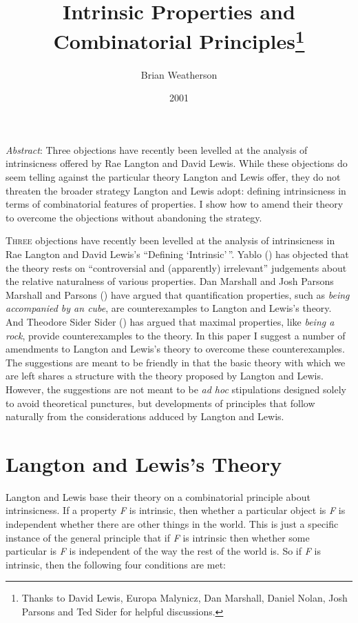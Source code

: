 \documentclass[
  11pt,
  letterpaper,
  DIV=11,
  numbers=noendperiod,
  twoside]{scrartcl}
\title{Intrinsic Properties and Combinatorial Principles\thanks{Thanks
to David Lewis, Europa Malynicz, Dan Marshall, Daniel Nolan, Josh
Parsons and Ted Sider for helpful discussions.}}
\author{Brian Weatherson}
\date{2001}
\renewenvironment{abstract}
 {\vspace{-1.25cm}
 \quotation\small\noindent\emph{Abstract}:}
 {\endquotation}
\renewenvironment{abstract}
 {\quotation\small\noindent\emph{Abstract}:}
 {\endquotation\vspace{-0.02cm}}
\renewcommand{\textsc}[1]{{\scfont #1}}
\begin{document}
\maketitle
\begin{abstract}
Three objections have recently been levelled at the analysis of
intrinsicness offered by Rae Langton and David Lewis. While these
objections do seem telling against the particular theory Langton and
Lewis offer, they do not threaten the broader strategy Langton and Lewis
adopt: defining intrinsicness in terms of combinatorial features of
properties. I show how to amend their theory to overcome the objections
without abandoning the strategy.
\end{abstract}


\lettrine{T}{hree} \textsc{objections} have recently been levelled at
the analysis of intrinsicness in Rae Langton and David Lewis's
``Defining `Intrinsic'\,''. Yablo () has
objected that the theory rests on ``controversial and (apparently)
irrelevant'' judgements about the relative naturalness of various
properties. Dan Marshall and Josh Parsons Marshall and Parsons
() have argued that quantification
properties, such as \emph{being accompanied by an cube}, are
counterexamples to Langton and Lewis's theory. And Theodore Sider Sider
() has argued that maximal properties,
like \emph{being a rock}, provide counterexamples to the theory. In this
paper I suggest a number of amendments to Langton and Lewis's theory to
overcome these counterexamples. The suggestions are meant to be friendly
in that the basic theory with which we are left shares a structure with
the theory proposed by Langton and Lewis. However, the suggestions are
not meant to be \emph{ad hoc} stipulations designed solely to avoid
theoretical punctures, but developments of principles that follow
naturally from the considerations adduced by Langton and Lewis.

\section{Langton and Lewis's Theory}\label{langton-and-lewiss-theory}

Langton and Lewis base their theory on a combinatorial principle about
intrinsicness. If a property \emph{F} is intrinsic, then whether a
particular object is \emph{F} is independent whether there are other
things in the world. This is just a specific instance of the general
principle that if \emph{F} is intrinsic then whether some particular is
\emph{F} is independent of the way the rest of the world is. So if
\emph{F} is intrinsic, then the following four conditions are met:
\end{document}
